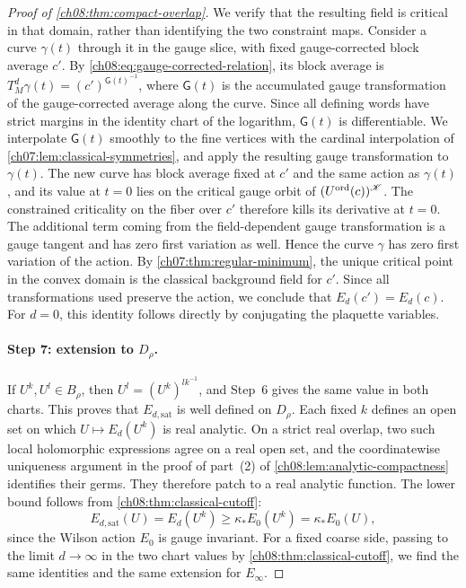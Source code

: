 \begin{proof}[Proof of \cref{ch08:thm:compact-overlap}]
We verify that the resulting field is critical in that domain, rather than identifying the two constraint maps. Consider a curve $\gamma(t)$ through it in the gauge slice, with fixed gauge-corrected block average $c'$. By \eqref{ch08:eq:gauge-corrected-relation}, its block average is $T_M^d\gamma(t)=(c')^{\mathsf G(t)^{-1}}$, where $\mathsf G(t)$ is the accumulated gauge transformation of the gauge-corrected average along the curve. Since all defining words have strict margins in the identity chart of the logarithm, $\mathsf G(t)$ is differentiable. We interpolate $\mathsf G(t)$ smoothly to the fine vertices with the cardinal interpolation of \cref{ch07:lem:classical-symmetries}, and apply the resulting gauge transformation to $\gamma(t)$. The new curve has block average fixed at $c'$ and the same action as $\gamma(t)$, and its value at $t=0$ lies on the critical gauge orbit of $(U^{\rm ord}(c))^{\mathscr K}$. The constrained criticality on the fiber over $c'$ therefore kills its derivative at $t=0$. The additional term coming from the field-dependent gauge transformation is a gauge tangent and has zero first variation as well. Hence the curve $\gamma$ has zero first variation of the action. By \cref{ch07:thm:regular-minimum}, the unique critical point in the convex domain is the classical background field for $c'$. Since all transformations used preserve the action, we conclude that $E_d(c')=E_d(c)$. For $d=0$, this identity follows directly by conjugating the plaquette variables.

\paragraph{Step 7: extension to $D_\rho$.}
If $U^k,U^l\in B_\rho$, then $U^l=(U^k)^{lk^{-1}}$, and Step~6 gives the same value in both charts. This proves that $E_{d,\mathrm{sat}}$ is well defined on $D_\rho$. Each fixed $k$ defines an open set on which $U\mapsto E_d(U^k)$ is real analytic. On a strict real overlap, two such local holomorphic expressions agree on a real open set, and the coordinatewise uniqueness argument in the proof of part~(2) of \cref{ch08:lem:analytic-compactness} identifies their germs. They therefore patch to a real analytic function. The lower bound follows from \cref{ch08:thm:classical-cutoff}:
\[
 E_{d,\mathrm{sat}}(U)=E_d(U^k)\ge\kappa_*E_0(U^k)=\kappa_*E_0(U),
\]
since the Wilson action $E_0$ is gauge invariant. For a fixed coarse side, passing to the limit $d\to\infty$ in the two chart values by \cref{ch08:thm:classical-cutoff}, we find the same identities and the same extension for $E_\infty$.
\end{proof}

